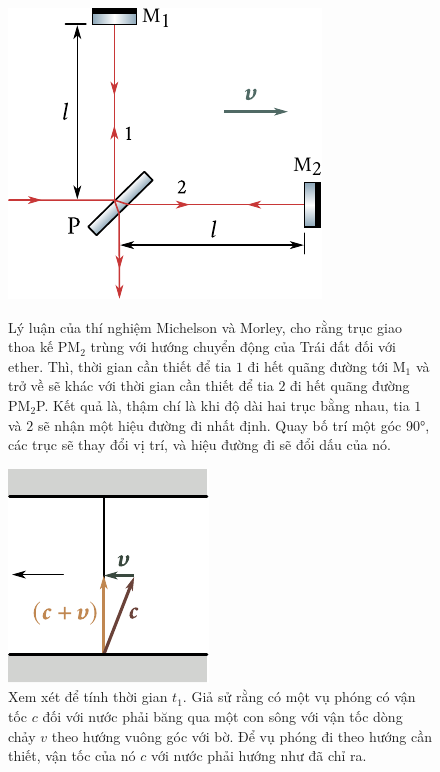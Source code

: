 \begin{figure}[!htb]
	\begin{minipage}[t]{0.6\linewidth}
		\begin{center}
			\includegraphics[scale=1]{figures/ch_21/fig_21_6.pdf}
            \caption[]{Lý luận của thí nghiệm Michelson và Morley, cho rằng trục giao thoa kế PM$_2$ trùng với hướng chuyển động của Trái đất đối với ether. Thì, thời gian cần thiết để tia $1$ đi hết quãng đường tới M$_1$ và trở về sẽ khác với thời gian cần thiết để tia $2$ đi hết quãng đường PM$_2$P. Kết quả là, thậm chí là khi độ dài hai trục bằng nhau, tia $1$ và $2$ sẽ nhận một hiệu đường đi nhất định.
			Quay bố trí một góc \ang{90}, các trục sẽ thay đổi vị trí, và hiệu đường đi sẽ đổi dấu của nó.}
			\label{fig:21_6}
		\end{center}
	\end{minipage}
	\hfill{ }%
	\begin{minipage}[t]{0.36\linewidth}
		\begin{center}
			\includegraphics[scale=1]{figures/ch_21/fig_21_7.pdf}
			\caption[]{Xem xét để tính thời gian $t_1$. Giả sử rằng có một vụ phóng có vận tốc $c$ đối với nước phải băng qua một con sông với vận tốc dòng chảy $v$ theo hướng vuông góc với bờ. Để vụ phóng đi theo hướng cần thiết, vận tốc của nó $c$ với nước phải hướng như đã chỉ ra.}
			\label{fig:21_7}
		\end{center}
	\end{minipage}
\vspace{-0.4cm}
\end{figure}

